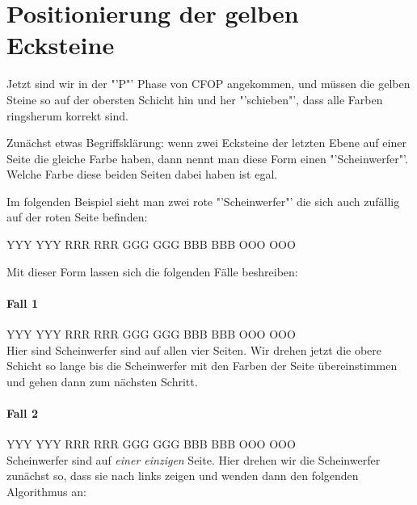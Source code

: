 \section{Positionierung der gelben Ecksteine}
Jetzt sind wir in der "'P"' Phase von CFOP angekommen, und müssen die gelben Steine so auf der obersten Schicht hin und her "'schieben"', dass alle Farben ringsherum korrekt sind.

Zunächst etwas Begriffsklärung: wenn zwei Ecksteine der letzten Ebene auf einer Seite die gleiche Farbe haben, dann nennt man diese Form einen "'Scheinwerfer"'.
Welche Farbe diese beiden Seiten dabei haben ist egal.

Im folgenden Beispiel sieht man zwei rote "'Scheinwerfer"' die sich auch zufällig auf der roten Seite befinden:

\begin{center}
  \RubikCubeGreyAll%
	      {Y}{Y}{Y}
	      {Y}{Y}{Y}%
		 {R}{R}{R}
		 {R}{R}{R}%
		 {G}{G}{G}
		 {G}{G}{G}%
		{B}{B}{B}
		{B}{B}{B}%
		{O}{O}{O}
		{O}{O}{O}%
\end{center}

Mit dieser Form lassen sich die folgenden Fälle beshreiben:

\paragraph{Fall 1}
\RubikCubeGreyAll%
            {Y}{Y}{Y}
            {Y}{Y}{Y}%
               {R}{R}{R}
	       {R}{R}{R}%
	       {G}{G}{G}
	       {G}{G}{G}%
	      {B}{B}{B}
	      {B}{B}{B}%
	      {O}{O}{O}
	      {O}{O}{O}%
\\[1em]
Hier sind Scheinwerfer sind auf allen vier Seiten.
Wir drehen jetzt die obere Schicht so lange bis die Scheinwerfer mit den Farben der Seite übereinstimmen und gehen dann zum nächsten Schritt.

\paragraph{Fall 2}
\RubikCubeGreyAll%
            {Y}{Y}{Y}
            {Y}{Y}{Y}%
               {R}{R}{R}
	       {R}{R}{R}%
	       {G}{G}{G}
	       {G}{G}{G}%
	      {B}{B}{B}
	      {B}{B}{B}%
	      {O}{O}{O}
	      {O}{O}{O}%
\\[1em]
Scheinwerfer sind auf \emph{einer einzigen} Seite. 
Hier drehen wir die Scheinwerfer zunächst so, dass sie nach links zeigen und wenden dann den folgenden Algorithmus an:
\begin{center}
\end{center}

